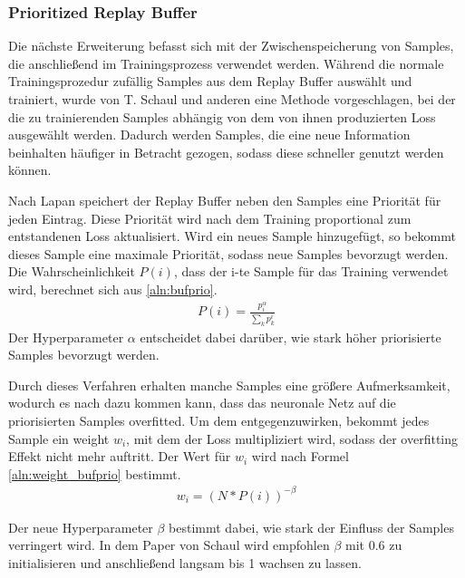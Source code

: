 \documentclass[11pt]{scrartcl}
\begin{document}


\subsubsection{Prioritized Replay Buffer}
Die nächste Erweiterung befasst sich mit der Zwischenspeicherung von Samples, die
anschließend im Trainingsprozess verwendet werden. Während die normale Trainingsprozedur
zufällig Samples aus dem Replay Buffer auswählt und trainiert, wurde von T. Schaul und
anderen \cite{schaul2015prioritized} eine Methode vorgeschlagen, bei der die zu
trainierenden Samples abhängig von dem von ihnen produzierten Loss ausgewählt werden.
Dadurch werden Samples, die eine neue Information beinhalten häufiger in Betracht
gezogen, sodass diese schneller genutzt werden können.

Nach Lapan \cite[~S. 282]{L2018} speichert der Replay Buffer neben den Samples eine
Priorität für jeden Eintrag. Diese Priorität wird nach dem Training proportional zum
entstandenen Loss aktualisiert. Wird ein neues Sample hinzugefügt, so bekommt dieses
Sample eine maximale Priorität, sodass neue Samples bevorzugt werden. Die
Wahrscheinlichkeit $P(i)$, dass der i-te Sample für das Training verwendet wird, berechnet
sich aus \autoref{aln:bufprio}.
\begin{align}
  P(i) = \frac{p_i^\alpha}{\sum_k p_k^i}
\label{aln:bufprio}
\end{align}
\noindent
Der Hyperparameter $\alpha$ entscheidet dabei darüber, wie stark höher priorisierte
Samples bevorzugt werden.

Durch dieses Verfahren erhalten manche Samples eine größere Aufmerksamkeit, wodurch es
nach \cite{schaul2015prioritized} dazu kommen kann, dass das neuronale Netz auf die
priorisierten Samples overfitted. Um dem entgegenzuwirken, bekommt jedes Sample ein
weight $w_i$, mit dem der Loss multipliziert wird, sodass der overfitting Effekt nicht
mehr auftritt. Der Wert für $w_i$ wird nach Formel \ref{aln:weight_bufprio} bestimmt.
\begin{align}
  w_i = \left(N * P(i)\right)^{-\beta}
\label{aln:weight_bufprio}
\end{align}

Der neue Hyperparameter $\beta$ bestimmt dabei, wie stark der Einfluss der Samples
verringert wird. In dem Paper von Schaul wird empfohlen $\beta$ mit 0.6 zu initialisieren
und anschließend langsam bis 1 wachsen zu lassen.
\end{document}

